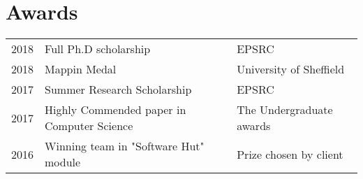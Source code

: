 \documentclass[]{deedy-resume-openfont}
\begin{document}
\begin{minipage}[t]{0.66\textwidth}

\section{Awards}
\begin{tabular}{rll}
2018	     & Full Ph.D scholarship & EPSRC\\
2018	     & Mappin Medal & University of Sheffield\\
2017	     & Summer Research Scholarship & EPSRC\\
2017	     & Highly Commended paper in Computer Science & The Undergraduate awards\\
2016	     & Winning team in "Software Hut" module  & Prize chosen by client \\
\end{tabular}
\sectionsep


\end{minipage}
\end{document}
